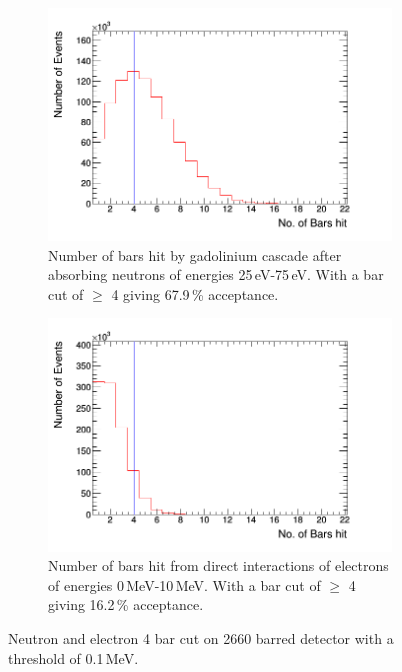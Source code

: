 \documentclass[12pt,a4paper]{article}
\begin{document}
\begin{figure}[H]
\centering
\begin{subfigure}{.5\textwidth}
  \centering
  \includegraphics[width=\linewidth]{4n0_1MeVbars.png}
  \captionsetup{width=.9\linewidth}
  \caption{Number of bars hit by gadolinium cascade after absorbing neutrons of energies 25\,eV-75\,eV. With a bar cut of $\geq$ 4 giving 67.9\,\% acceptance.}
  \label{4bar_n_cut}
\end{subfigure}%
\begin{subfigure}{.5\textwidth}
  \centering
  \includegraphics[width=\linewidth]{4e0_1MeVbars.png}
  \captionsetup{width=.9\linewidth}
  \caption{Number of bars hit from direct interactions of electrons of energies 0\,MeV-10\,MeV. With a bar cut of $\geq$ 4 giving 16.2\,\% acceptance. \\}
  \label{4bar_e_cut}
\end{subfigure}
\caption{Neutron and electron 4 bar cut on 2660 barred detector with a threshold of 0.1\,MeV.}
\label{4_bar_cut}
\end{figure}
\end{document}
